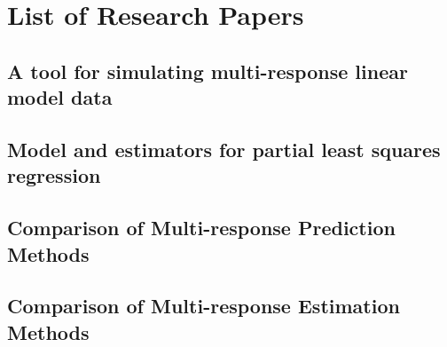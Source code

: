\documentclass[11pt,twoside,openright,titlepage,
  headinclude,footinclude,BCOR=5mm,
  numbers=noenddot,cleardoublepage=empty,
  tablecaptionabove, dottedtoc,
  bibliography=totoc]{scrreprt}
\begin{document}
  \renewcommand\bibname{References}
  


\nocite{*}

\appendix
\part*{List of Research Papers}
\par\chapter{A tool for simulating multi-response linear model data}
\cleardoublepage

%
\par\chapter{Model and estimators for partial least squares regression}
\cleardoublepage

%
\par\chapter{Comparison of Multi-response Prediction Methods}
\cleardoublepage

%
\par\chapter{Comparison of Multi-response Estimation Methods}
\cleardoublepage

%

\end{document}
